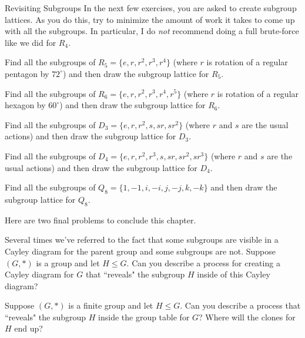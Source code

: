 \begin{section}{Revisiting Subgroups}
In the next few exercises, you are asked to create subgroup lattices.  As you do this, try to minimize the amount of work it takes to come up with all the subgroups.  In particular, I do \emph{not} recommend doing a full brute-force like we did for $R_4$. 

\begin{exercise}
Find all the subgroups of $R_5=\{e,r,r^2,r^3,r^4\}$ (where $r$ is rotation of a regular pentagon by $72^{\circ}$) and then draw the subgroup lattice for $R_5$.
\end{exercise}

\begin{exercise}
Find all the subgroups of $R_6=\{e,r,r^2,r^3,r^4,r^5\}$ (where $r$ is rotation of a regular hexagon by $60^{\circ}$) and then draw the subgroup lattice for $R_6$.
\end{exercise}

\begin{exercise}
Find all the subgroups of $D_3=\{e,r,r^2,s,sr,sr^2\}$ (where $r$ and $s$ are the usual actions) and then draw the subgroup lattice for $D_3$.
\end{exercise}

\begin{exercise}
Find all the subgroups of $D_4=\{e,r,r^2,r^3,s,sr,sr^2,sr^3\}$ (where $r$ and $s$ are the usual actions) and then draw the subgroup lattice for $D_4$.
\end{exercise}

\begin{exercise}
Find all the subgroups of $Q_8=\{1,-1,i,-i,j,-j,k,-k\}$ and then draw the subgroup lattice for $Q_8$.
\end{exercise}

Here are two final problems to conclude this chapter.

\begin{problem}
Several times we've referred to the fact that some subgroups are visible in a Cayley diagram for the parent group and some subgroups are not.  Suppose $(G,*)$ is a group and let $H\leq G$.  Can you describe a process for creating a Cayley diagram for $G$ that ``reveals" the subgroup $H$ inside of this Cayley diagram?
\end{problem}

\begin{problem}
Suppose $(G,*)$ is a finite group and let $H\leq G$.  Can you describe a process that ``reveals" the subgroup $H$ inside the group table for $G$?  Where will the clones for $H$ end up?
\end{problem}

\end{section}

